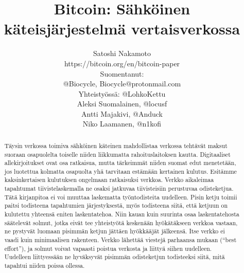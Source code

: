 \documentclass{article}
\begin{document}
\title{Bitcoin: Sähköinen käteisjärjestelmä vertaisverkossa}
\author[1]{\small{Satoshi Nakamoto \\\vspace{-3mm} https://bitcoin.org/en/bitcoin-paper} \\
\vspace{0mm}
\footnotesize{Suomentanut: \\ @Biocycle, Biocycle@protonmail.com \\
Yhteistyössä: @LohkoKettu \\ Aleksi Suomalainen, @locusf \\ Antti Majakivi, @Anduck \\ Niko Laamanen, @n1kofi}}
\date{}
\maketitle

\begin{abstract}
Täysin verkossa toimiva sähköinen käteinen mahdollistaa verkossa tehtävät maksut suoraan osapuolelta toiselle niiden liikkumatta rahoituslaitoksen kautta. Digitaaliset allekirjoitukset ovat osa ratkaisua, mutta tär\-keim\-mät niiden suomat edut menetetään, jos luotettua kolmatta osapuolta yhä tarvitaan estämään kertainen kulutus. Esitämme kaksinkertaisen kulutuksen ongelmaan ratkaisuksi verkkoa. Verkko aikaleimaa tapahtumat tiivistelaskemalla ne osaksi jatkuvaa tiivisteisiin perustuvaa odisteketjua. Tätä kirjanpitoa ei voi muuttaa laskematta työntodisteita uudelleen. Pisin ketju toimii paitsi todisteena tapahtumien järjestyksestä, myös todisteena siitä, että ketjuun on kulutettu yhteensä eniten laskentatehoa. Niin kauan kuin suurinta osaa laskentatehosta säätelevät solmut, jotka eivät tee yhteistyötä keskenään hyökätäkseen verkkoa vastaan, ne pystyvät luomaan pisimmän ketjun jättäen hyökkääjät jälkeensä. Itse verkko ei vaadi kuin minimaalisen rakenteen. Verkko lä\-het\-tää  viestejä parhaansa mukaan (“best effort”), ja solmut voivat vapaasti poistua verkosta ja liittyä siihen uudelleen. Uudelleen liittyessään ne hy\-väk\-sy\-vät  pisimmän odisteketjun todisteeksi siitä, mitä tapahtui niiden poissa ollessa.

\end{abstract}
\end{document}
